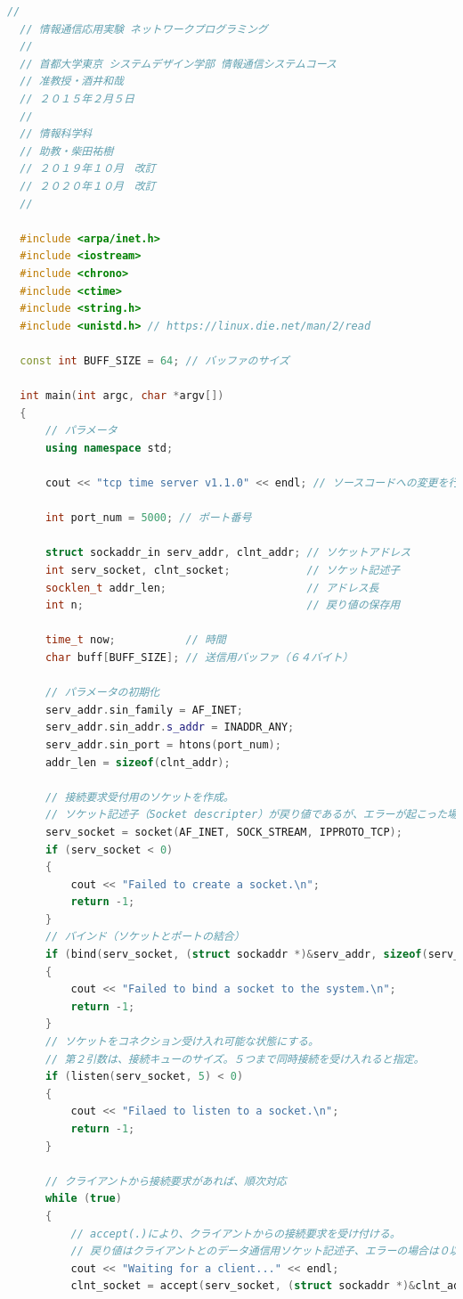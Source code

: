 \documentclass[fleqn, a4paper. 12pt]{ltjsarticle}
\begin{document}
\begin{lstlisting}[language=C++]
  //
  // 情報通信応用実験 ネットワークプログラミング
  //
  // 首都大学東京 システムデザイン学部 情報通信システムコース
  // 准教授・酒井和哉
  // ２０１５年２月５日
  //
  // 情報科学科
  // 助教・柴田祐樹
  // ２０１９年１０月　改訂
  // ２０２０年１０月　改訂
  //
  
  #include <arpa/inet.h>
  #include <iostream>
  #include <chrono>
  #include <ctime>
  #include <string.h>
  #include <unistd.h> // https://linux.die.net/man/2/read
  
  const int BUFF_SIZE = 64; // バッファのサイズ
  
  int main(int argc, char *argv[])
  {
      // パラメータ
      using namespace std;
      
      cout << "tcp time server v1.1.0" << endl; // ソースコードへの変更を行ったら数値を変える．
  
      int port_num = 5000; // ポート番号
  
      struct sockaddr_in serv_addr, clnt_addr; // ソケットアドレス
      int serv_socket, clnt_socket;            // ソケット記述子
      socklen_t addr_len;                      // アドレス長
      int n;                                   // 戻り値の保存用
  
      time_t now;           // 時間
      char buff[BUFF_SIZE]; // 送信用バッファ（６４バイト）
  
      // パラメータの初期化
      serv_addr.sin_family = AF_INET;
      serv_addr.sin_addr.s_addr = INADDR_ANY;
      serv_addr.sin_port = htons(port_num);
      addr_len = sizeof(clnt_addr);
  
      // 接続要求受付用のソケットを作成。
      // ソケット記述子（Socket descripter）が戻り値であるが、エラーが起こった場合は「-1」が返される。
      serv_socket = socket(AF_INET, SOCK_STREAM, IPPROTO_TCP);
      if (serv_socket < 0)
      {
          cout << "Failed to create a socket.\n";
          return -1;
      }
      // バインド（ソケットとポートの結合）
      if (bind(serv_socket, (struct sockaddr *)&serv_addr, sizeof(serv_addr)) < 0)
      {
          cout << "Failed to bind a socket to the system.\n";
          return -1;
      }
      // ソケットをコネクション受け入れ可能な状態にする。
      // 第２引数は、接続キューのサイズ。５つまで同時接続を受け入れると指定。
      if (listen(serv_socket, 5) < 0)
      {
          cout << "Filaed to listen to a socket.\n";
          return -1;
      }
  
      // クライアントから接続要求があれば、順次対応
      while (true)
      {
          // accept(.)により、クライアントからの接続要求を受け付ける。
          // 戻り値はクライアントとのデータ通信用ソケット記述子、エラーの場合は０以下の値が返される。
          cout << "Waiting for a client..." << endl;
          clnt_socket = accept(serv_socket, (struct sockaddr *)&clnt_addr, &addr_len);
  

\end{lstlisting}
\end{document}
